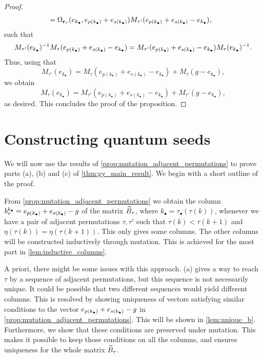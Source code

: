 \begin{proof}
\begin{align*}
		 & = \Omega_{\mathbf{r}_{\tau}}(e_{k_\bullet}, e_{p(k_\bullet)} + e_{s(k_\bullet)}) M_{\tau'}(e_{p(k_\bullet)} + e_{s(k_\bullet)} - e_{k_\bullet}),
	\end{align*}
	such that
	\begin{equation*}
		M_{\tau'}(e_{k_\bullet})^{-1} M_\tau(e_{p(k_\bullet)} + e_{s(k_\bullet)} - e_{k_\bullet}) = M_{\tau'}(e_{p(k_\bullet)} + e_{s(k_\bullet)} - e_{k_\bullet})M_\tau(e_{k_\bullet})^{-1}.
	\end{equation*}
	Thus, using that
	\begin{equation*}
		M_{\tau'}(e_{k_\bullet}) = M_{\tau}(e_{p(k_\bullet)}+e_{s(k_\bullet)}-e_{k_\bullet}) + M_{\tau}(g-e_{k_\bullet}),
	\end{equation*}
	we obtain
	\begin{equation*}
		M_{\tau}(e_{k_\bullet}) = M_{\tau'}(e_{p(k_\bullet)}+e_{s(k_\bullet)}-e_{k_\bullet}) + M_{\tau'}(g-e_{k_\bullet}),
	\end{equation*}
	as desired. This concludes the proof of the proposition.
\end{proof}

\section{Constructing quantum seeds}

We will now use the results of \cref{prop:mutation_adjacent_permutations} to prove
parts (a), (b) and (c) of \cref{thm:gy_main_result}. We begin with a short outline of
the proof.

From \cref{prop:mutation_adjacent_permutations} we obtain the column
$b^{k_\bullet}_{\tau} = e_{p(k_\bullet)} + e_{s(k_\bullet)} - g$ of the matrix $\widetilde{B}_\tau$, where $k_\bullet =
	\tau_\bullet(\tau(k))$, whenever we have a pair of adjacent permutations $\tau, \tau'$
such that $\tau(k) < \tau(k+1)$ and $\eta(\tau(k)) = \eta(\tau(k+1))$. This only gives
some columns. The other columns will be constructed inductively through mutation. This
is achieved for the most part in \cref{lem:inductive_columns}.

A priori, there might be some issues with this approach.  (a)
gives a way to reach $\tau$ by a sequence of adjacent permutations, but this sequence
is not necessarily unique. It could be possible that two different sequences would
yield different columns. This is resolved by showing uniqueness of vectors satisfying
similar conditions to the vector $e_{p(k_\bullet)} + e_{s(k_\bullet)} -g$ in
\cref{prop:mutation_adjacent_permutations}. This will be shown in \cref{lem:unique_b}.
Furthermore, we show that these conditions are preserved under mutation. This makes it
possible to keep those conditions on all the columns, and ensures uniqueness for the
whole matrix $\widetilde{B}_\tau$.

